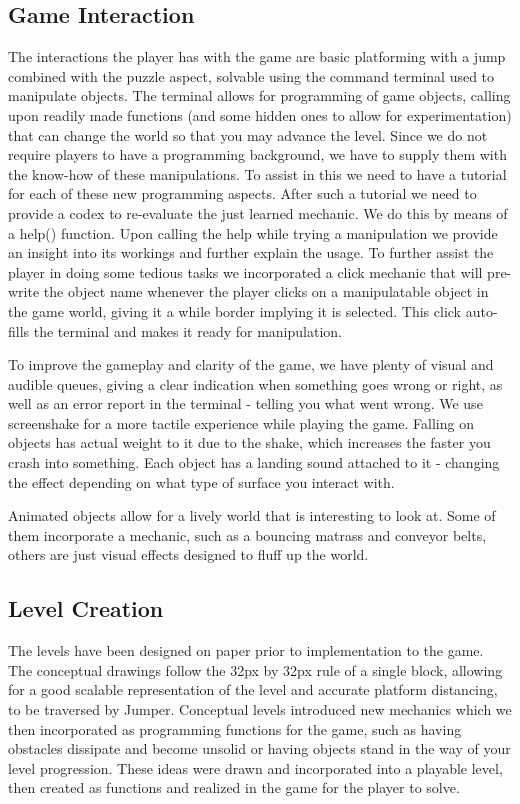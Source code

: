 \documentclass[a4paper,twoside,12pt]{article}
\begin{document}
\subsection{Game Interaction}
The interactions the player has with the game are basic platforming with a jump combined with the puzzle aspect, solvable using the command terminal used to manipulate objects. The terminal allows for programming of game objects, calling upon readily made functions (and some hidden ones to allow for experimentation) that can change the world so that you may advance the level. Since we do not require players to have a programming background, we have to supply them with the know-how of these manipulations. To assist in this we need to have a tutorial for each of these new programming aspects. After such a tutorial we need to provide a codex to re-evaluate the just learned mechanic. We do this by means of a help() function. Upon calling the help while trying a manipulation we provide an insight into its workings and further explain the usage. To further assist the player in doing some tedious tasks we incorporated a click mechanic that will pre-write the object name whenever the player clicks on a manipulatable object in the game world, giving it a while border implying it is selected. This click auto-fills the terminal and makes it ready for manipulation.

To improve the gameplay and clarity of the game, we have plenty of visual and audible queues, giving a clear indication when something goes wrong or right, as well as an error report in the terminal - telling you what went wrong. We use screenshake for a more tactile experience while playing the game. Falling on objects has actual weight to it due to the shake, which increases the faster you crash into something. Each object has a landing sound attached to it - changing the effect depending on what type of surface you interact with.

Animated objects allow for a lively world that is interesting to look at. Some of them incorporate a mechanic, such as a bouncing matrass and conveyor belts, others are just visual effects designed to fluff up the world. 


\subsection{Level Creation}
The levels have been designed on paper prior to implementation to the game. The conceptual drawings follow the 32px by 32px rule of a single block, allowing for a good scalable representation of the level and accurate platform distancing, to be traversed by Jumper. Conceptual levels introduced new mechanics which we then incorporated as programming functions for the game, such as having obstacles dissipate and become unsolid or having objects stand in the way of your level progression. These ideas were drawn and incorporated into a playable level, then created as functions and realized in the game for the player to solve.
\end{document}
